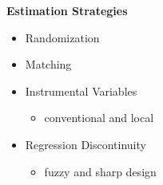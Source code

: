 \begin{frame}\textbf{Estimation Strategies}
\begin{itemize}\setlength\itemsep{1em}
\item Randomization
\item Matching
\item Instrumental Variables
\begin{itemize}
\item conventional and local
\end{itemize}
\item Regression Discontinuity
\begin{itemize}\setlength\itemsep{1em}
\item fuzzy and sharp design
\end{itemize}
\end{itemize}
\end{frame}
